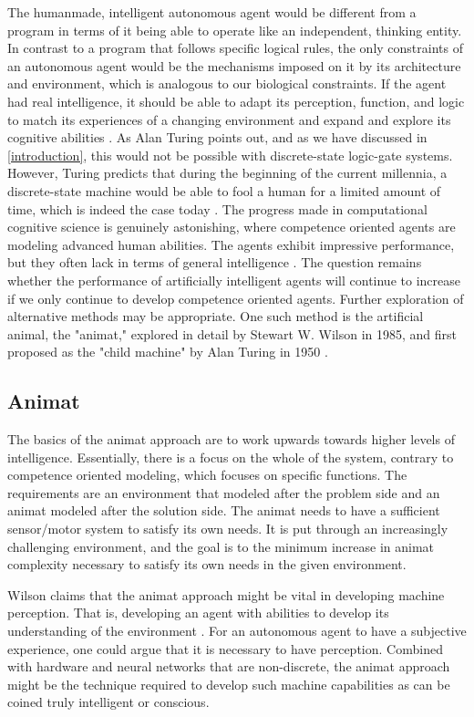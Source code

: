 The humanmade, intelligent autonomous agent would be different from a program in terms of it being able to operate like an independent, thinking entity.
In contrast to a program that follows specific logical rules,  the only constraints of an autonomous agent would be the mechanisms imposed on it by its architecture and environment, which is analogous to our biological constraints.
If the agent had real intelligence, it should be able to adapt its perception, function, and logic to match its experiences of a changing environment and expand and explore its cognitive abilities \cite{franklin_is_1997}.
As Alan Turing points out, and as we have discussed in \vref{introduction}, this would not be possible with discrete-state logic-gate systems.
However, Turing predicts that during the beginning of the current millennia, a discrete-state machine would be able to fool a human for a limited amount of time,
which is indeed the case today \cite{turing_computing_2009}.
The progress made in computational cognitive science is genuinely astonishing, where competence oriented agents are modeling advanced human abilities.
The agents exhibit impressive performance, but they often lack in terms of general intelligence \cite{wilson_animat_1991}.
The question remains whether the performance of artificially intelligent agents will continue to increase if we only continue to develop competence oriented agents. Further exploration of alternative methods may be appropriate.
One such method is the artificial animal, the "animat," explored in detail by Stewart W. Wilson in 1985, and first proposed as the "child machine" by Alan Turing in 1950 \cite{wilson_animat_1991} \cite{turing_computing_2009}.

\subsection{Animat}
The basics of the animat approach are to work upwards towards higher levels of intelligence.
Essentially, there is a focus on the whole of the system, contrary to competence oriented modeling, which focuses on specific functions.
The requirements are an environment that modeled after the problem side and an animat modeled after the solution side.   The animat needs to have a sufficient sensor/motor system to satisfy its own needs. It is put through an increasingly challenging environment, and the goal is to the minimum increase in animat complexity necessary to satisfy its own needs in the given environment.

Wilson claims that the animat approach might be vital in developing machine perception.
That is, developing an agent with abilities to develop its understanding of the environment \cite{wilson_animat_1991}.
For an autonomous agent to have a subjective experience, one could argue that it is necessary to have perception.
Combined with hardware and neural networks that are non-discrete, the animat approach might be the technique required to develop such machine capabilities as can be coined truly intelligent or conscious.




